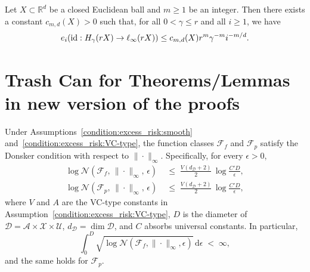 \begin{theorem}\label{thm:entropy_gaussian} Let $X \subset \mathbb{R}^d$ be a closed Euclidean ball and $m \ge 1$ be an integer. Then there exists a constant $c_{m,d}(X)>0$ such that, for all $0 < \gamma \le r$ and all $i \ge 1$, we have
\[
e_i(\textnormal{id} : H_{\gamma}(rX) \to \ell_{\infty}(rX)) \le c_{m,d}(X)r^m \gamma^{-m} i^{-m/d}.
\]

\end{theorem}

\section{Trash Can for Theorems/Lemmas in new version of the proofs}
\begin{lemma}\label{lemma:covering_number_Linfty}
Under Assumptions~\ref{condition:excess_risk:smooth} and~\ref{condition:excess_risk:VC-type}, the function classes $\mathcal{F}_f$ and $\mathcal{F}_p$ satisfy the Donsker condition with respect to $\|\cdot\|_\infty$. Specifically, for every $\epsilon > 0$,
\begin{align*}
\log\mathcal{N}(\mathcal{F}_f,\,\|\cdot\|_\infty,\,\epsilon)
&\;\leq\; \frac{V(d_{\mathcal{D}}+2)}{2}\,\log\!\frac{C'\!D}{\epsilon},\\
\log\mathcal{N}(\mathcal{F}_p,\,\|\cdot\|_\infty,\,\epsilon)
&\;\leq\; \frac{V(d_{\mathcal{D}}+2)}{2}\,\log\!\frac{C'\!D}{\epsilon},
\end{align*}
where $V$ and $A$ are the VC-type constants in Assumption~\ref{condition:excess_risk:VC-type}, $D$ is the diameter of $\mathcal{D}=\mathcal{A}\times\mathcal{X}\times\mathcal{U}$, $d_{\mathcal{D}}=\dim\mathcal{D}$, and $C$ absorbs universal constants. In particular,
\[
\int_0^{D}\sqrt{\log\mathcal{N}(\mathcal{F}_f,\|\cdot\|_\infty,\epsilon)}\,\mathrm{d}\epsilon \;<\;\infty,
\]
and the same holds for $\mathcal{F}_p$.
\end{lemma}

